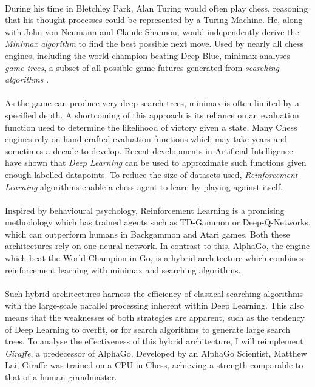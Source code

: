 \documentclass[a4paper]{book}
\begin{document}
\paragraph{}During his time in Bletchley Park, Alan Turing would often play chess, reasoning that his thought processes could be represented by a Turing Machine. \cite{michieIntel} He, along with John von Neumann and Claude Shannon, would independently derive the \textit{Minimax algorithm} to find the best possible next move. \cite{giraffe} \cite{michieIntel} Used by nearly all chess engines, including the world-champion-beating Deep Blue, minimax analyses \textit{game trees}, a subset of all possible game futures generated from \textit{searching algorithms} \cite{deepBlue}.

\paragraph{}As the game can produce very deep search trees, minimax is often limited by a specified depth. \cite{russellNorvig} A shortcoming of this approach is its reliance on an evaluation function used to determine the likelihood of victory given a state. \cite{giraffe} Many Chess engines rely on hand-crafted evaluation functions which may take years and sometimes a decade to develop. \cite{stockfish} Recent developments in Artificial Intelligence have shown that \textit{Deep Learning} can be used to approximate such functions given enough labelled datapoints. \cite{bishop} To reduce the size of datasets used, \textit{Reinforcement Learning} algorithms enable a chess agent to learn by playing against itself. \cite{giraffe}

\paragraph{}Inspired by behavioural psychology, \cite{Sutton} Reinforcement Learning is a promising methodology which has trained agents such as TD-Gammon or Deep-Q-Networks, which can outperform humans in Backgammon and Atari games. \cite{TD-Gammon} \cite{DQN} Both these architectures rely on one neural network. In contrast to this, AlphaGo, the engine which beat the World Champion in Go, is a hybrid architecture which combines reinforcement learning with minimax and searching algorithms. \cite{AlphaGo}

\paragraph{}Such hybrid architectures harness the efficiency of classical searching algorithms with the large-scale parallel processing inherent within Deep Learning. This also means that the weaknesses of both strategies are apparent, such as the tendency of Deep Learning to overfit, or for search algorithms to generate large search trees. To analyse the effectiveness of this hybrid architecture, I will reimplement \textit{Giraffe}, a predecessor of AlphaGo. Developed by an AlphaGo Scientist, Matthew Lai, Giraffe was trained on a CPU in Chess, achieving a strength comparable to that of a human grandmaster. \cite{giraffe}
\end{document}
